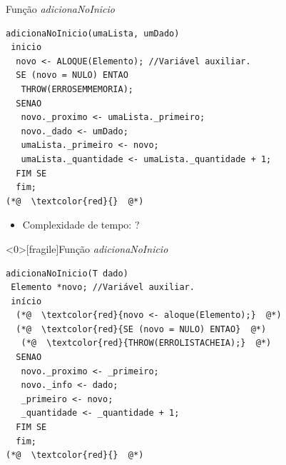 \documentclass[12pt,table,xcolor={dvipsnames}]{beamer}
\begin{document}
\begin{frame}[fragile]{Função \textit{adicionaNoInicio}}
\begin{lstlisting}
adicionaNoInicio(umaLista, umDado)
 inicio
  novo <- ALOQUE(Elemento); //Variável auxiliar.
  SE (novo = NULO) ENTAO
   THROW(ERROSEMMEMORIA);
  SENAO
   novo._proximo <- umaLista._primeiro;
   novo._dado <- umDado;
   umaLista._primeiro <- novo;
   umaLista._quantidade <- umaLista._quantidade + 1;
  FIM SE
  fim;
(*@  \textcolor{red}{}  @*)
\end{lstlisting}
\begin{itemize}
	\item Complexidade de tempo: ?
\end{itemize}
\end{frame}

\begin{frame}<0>[fragile]{Função \textit{adicionaNoInicio}}
\begin{lstlisting}
adicionaNoInicio(T dado)
 Elemento *novo; //Variável auxiliar.
 início
  (*@  \textcolor{red}{novo <- aloque(Elemento);}  @*)
  (*@  \textcolor{red}{SE (novo = NULO) ENTAO}  @*)
   (*@  \textcolor{red}{THROW(ERROLISTACHEIA);}  @*)
  SENAO
   novo._proximo <- _primeiro;
   novo._info <- dado;
   _primeiro <- novo;
   _quantidade <- _quantidade + 1;
  FIM SE
  fim;
(*@  \textcolor{red}{}  @*)
\end{lstlisting}
\end{frame}
\end{document}
